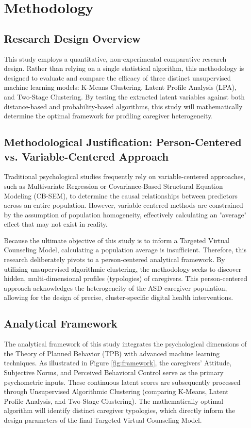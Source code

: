 \chapter{Methodology}

\section{Research Design Overview}
This study employs a quantitative, non-experimental comparative research design. Rather than relying on a single statistical algorithm, this methodology is designed to evaluate and compare the efficacy of three distinct unsupervised machine learning models: K-Means Clustering, Latent Profile Analysis (LPA), and Two-Stage Clustering. By testing the extracted latent variables against both distance-based and probability-based algorithms, this study will mathematically determine the optimal framework for profiling caregiver heterogeneity.

\section{Methodological Justification: Person-Centered vs. Variable-Centered Approach}
Traditional psychological studies frequently rely on variable-centered approaches, such as Multivariate Regression or Covariance-Based Structural Equation Modeling (CB-SEM), to determine the causal relationships between predictors across an entire population. However, variable-centered methods are constrained by the assumption of population homogeneity, effectively calculating an "average" effect that may not exist in reality.

Because the ultimate objective of this study is to inform a Targeted Virtual Counseling Model, calculating a population average is insufficient. Therefore, this research deliberately pivots to a person-centered analytical framework. By utilizing unsupervised algorithmic clustering, the methodology seeks to discover hidden, multi-dimensional profiles (typologies) of caregivers. This person-centered approach acknowledges the heterogeneity of the ASD caregiver population, allowing for the design of precise, cluster-specific digital health interventions.

\section{Analytical Framework}
The analytical framework of this study integrates the psychological dimensions of the Theory of Planned Behavior (TPB) with advanced machine learning techniques. As illustrated in Figure \ref{fig:framework}, the caregivers' Attitude, Subjective Norms, and Perceived Behavioral Control serve as the primary psychometric inputs. These continuous latent scores are subsequently processed through Unsupervised Algorithmic Clustering (comparing K-Means, Latent Profile Analysis, and Two-Stage Clustering). The mathematically optimal algorithm will identify distinct caregiver typologies, which directly inform the design parameters of the final Targeted Virtual Counseling Model.

